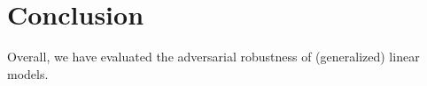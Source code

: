 \documentclass{article}
\begin{document}
\section{Conclusion}
Overall, we have evaluated the adversarial robustness of (generalized) linear models.



\newpage


\end{document}
